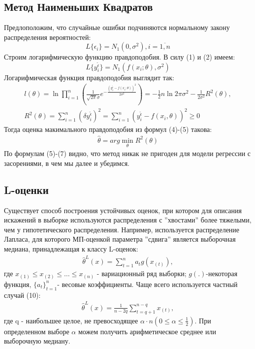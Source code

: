 \documentclass[12pt]{article}
\begin{document}
\subsection{Метод Наименьших Квадратов}
Предлоположим, что случайные ошибки подчиняются нормальному закону распределения вероятностей:
\begin{equation}
    L\{\epsilon_i\}=N_1(0,\sigma^2), i = \overline{1,n}
\end{equation}
Строим логарифмическую функцию правдоподобия. В силу (1) и (2) имеем:
\begin{equation}
    L\{y_i^{\widetilde{\epsilon}}\}=N_1(f(x_i;\theta), \sigma^2)
\end{equation}
Логарифмическая функция правдоподобия выглядит так\cite{Kharin}:
\begin{eqnarray}
    l(\theta)=\ln \prod_{i=1}^{n}(\frac{1}{\sqrt{2\pi}\sigma}e^{-\frac{(y_i^{\widetilde{\epsilon}}-f(x_i;\theta))^2}{2\sigma^2}})=-\frac{1}{2}n\ln{2\pi\sigma^2}-\frac{1}{2\sigma^2}R^2(\theta),\\
    R^2(\theta)=\sum_{i=1}^{n}(\delta y_i^{\widetilde{\epsilon}})^2=\sum_{i=1}^{n}(y_i^{\widetilde{\epsilon}}-f(x_i,\theta))^2\geq 0
\end{eqnarray}
Тогда оценка макимального правдоподобия из формул (4)-(5) такова:
\begin{eqnarray}
    \hat{\theta}=arg \min_{\theta}R^2(\theta)
\end{eqnarray}
По формулам (5)-(7) видно, что метод никак не пригоден для модели регрессии с засорениями, в чем мы далее и убедимся.

\subsection{L-оценки}
Существует способ построения устойчивых оценок, при котором для описания искажений в выборке используются распределения с ''хвостами'' более тяжелыми, чем у гипотетического распределения.
Например, используется распределение Лапласа, для которого МП-оценкой параметра ''сдвига'' является выборочная медиана, принадлежащая к классу L-оценок:
\begin{eqnarray}
    \hat{\theta}^L(x)=\sum_{t=1}^n a_tg(x_{(t)}),
\end{eqnarray}
где $x_{(1)}\leq x_{(2)} \leq \dots \leq x_{(n)}$ - вариационный ряд выборки; $g(.)$-некоторая функция, $\{a_t\}_{t=1}^n$- весовые коэффициенты.\hfill\break
Чаще всего используется частный случай (10):
\begin{eqnarray}
    \hat{\theta}^L(x)=\frac{1}{n-2q}\sum_{t=q+1}^{n-q}x_{(t)},
\end{eqnarray}
где q - наибольшее целое, не превосходящее $\alpha \cdot n (0\leq \alpha \leq \frac{1}{2})$.
При определенном выборе $\alpha$ можем получить арифметическое среднее или выборочную медиану.
\end{document}
